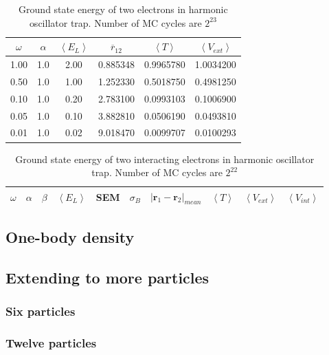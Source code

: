 \begin{table}[H]\caption{Ground state energy of two electrons in harmonic oscillator trap. Number of MC cycles are $2^{23}$}\label{tab:ground_state_energy_brute_force}
\center
\begin{tabular}{c|ccccc}
$\omega$ & $\alpha$ & $\left< E_L \right>$ & $\overline{r}_{12} $ & $\left< T \right>$  & $\left< V_{ext}\right>$ \\ \hline
1.00 & 1.0 & 2.00 & 0.885348 &  0.9965780 & 1.0034200 \\
0.50 & 1.0 & 1.00 & 1.252330 & 0.5018750 & 0.4981250 \\
0.10 & 1.0 & 0.20 & 2.783100 & 0.0993103 & 0.1006900 \\
0.05 & 1.0 & 0.10 & 3.882810 & 0.0506190 & 0.0493810 \\
0.01 & 1.0 & 0.02 & 9.018470 & 0.0099707 &  0.0100293 \\
\end{tabular}
\end{table}

\begin{table}[H]\caption{Ground state energy of two interacting electrons in harmonic oscillator trap. Number of MC cycles are $2^{22}$}\label{tab:ground_state_energy_importance_interaction}
\center
\begin{tabular}{c|ccccccccc}
$\omega$ & $\alpha$ & $\beta$ & $\left< E_L \right>$ & SEM & $\sigma_B$ & $|\bm{r}_1-\bm{r}_2|_{mean}$ & $\left< T \right>$  & $\left< V_{ext}\right>$ & $\left<V_{int} \right>$  \\ \hline
\end{tabular}
\end{table}

\subsection{One-body density}



\subsection{Extending to more particles}

\subsubsection{Six particles}

\subsubsection{Twelve particles}

